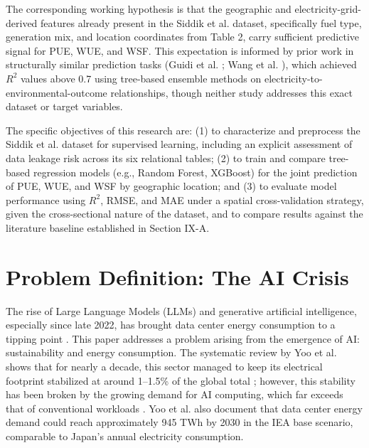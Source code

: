 \documentclass[conference]{IEEEtran}
\begin{document}
The corresponding working hypothesis is that the geographic and electricity-grid-derived features already present in the Siddik et al. dataset, specifically fuel type, generation mix, and location coordinates from Table 2, carry sufficient predictive signal for PUE, WUE, and WSF. This expectation is informed by prior work in structurally similar prediction tasks (Guidi et al. \cite{Guidi2024}; Wang et al. \cite{Wang2025XGBoost}), which achieved $R^2$ values above 0.7 using tree-based ensemble methods on electricity-to-environmental-outcome relationships, though neither study addresses this exact dataset or target variables.

The specific objectives of this research are: (1) to characterize and preprocess the Siddik et al. dataset for supervised learning, including an explicit assessment of data leakage risk across its six relational tables; (2) to train and compare tree-based regression models (e.g., Random Forest, XGBoost) for the joint prediction of PUE, WUE, and WSF by geographic location; and (3) to evaluate model performance using $R^2$, RMSE, and MAE under a spatial cross-validation strategy, given the cross-sectional nature of the dataset, and to compare results against the literature baseline established in Section IX-A.

\section{Problem Definition: The AI Crisis}

The rise of Large Language Models (LLMs) and generative artificial intelligence, especially since late 2022, has brought data center energy consumption to a tipping point \cite{Yoo2026}. This paper addresses a problem arising from the emergence of AI: sustainability and energy consumption. The systematic review by Yoo et al. \cite{Yoo2026} shows that for nearly a decade, this sector managed to keep its electrical footprint stabilized at around 1–1.5\% of the global total \cite{Yoo2026}; however, this stability has been broken by the growing demand for AI computing, which far exceeds that of conventional workloads \cite{Yoo2026}. Yoo et al. \cite{Yoo2026} also document that data center energy demand could reach approximately 945 TWh by 2030 in the IEA base scenario, comparable to Japan's annual electricity consumption.
\end{document}
